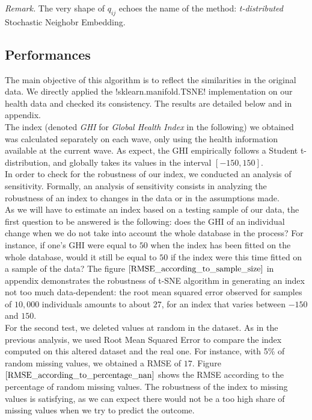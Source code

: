 \documentclass[]{article}
\begin{document}
\noindent
\textit{Remark.} The very shape of $q_{ij}$ echoes the name of the method: \textit{t-distributed} Stochastic Neighobr Embedding.

\subsection{Performances}
The main objective of this algorithm is to reflect the similarities in the original data. We directly applied the \pyth!sklearn.manifold.TSNE! implementation on our health data and checked its consistency. The results are detailed below and in appendix.\\

\noindent
The index (denoted \textit{GHI} for \textit{Global Health Index} in the following) we obtained was calculated separately on each wave, only using the health information available at the current wave. As expect, the GHI empirically follows a Student t-distribution, and globally takes its values in the interval $[-150, 150]$.\\

\noindent
In order to check for the robustness of our index, we conducted an analysis of sensitivity. Formally, an analysis of sensitivity consists in analyzing the robustness of an index to changes in the data or in the assumptions made.\\
As we will have to estimate an index based on a testing sample of our data, the first question to be answered is the following: does the GHI of an individual change when we do not take into account the whole database in the process? For instance, if one's GHI were equal to $50$ when the index has been fitted on the whole database, would it still be equal to $50$ if the index were this time fitted on a sample of the data? The figure $\ref{RMSE_according_to_sample_size}$ in appendix demonstrates the robustness of t-SNE algorithm in generating an index not too much data-dependent: the root mean squared error observed for samples of $10,000$ individuals amounts to about $27$, for an index that varies between $-150$ and $150$.\\
For the second test, we deleted values at random in the dataset. As in the previous analysis, we used Root Mean Squared Error to compare the index computed on this altered dataset and the real one. For instance, with 5\% of random missing values, we obtained a RMSE of $17$. Figure $\ref{RMSE_according_to_percentage_nan}$ shows the RMSE according to the percentage of random missing values. The robustness of the index to missing values is satisfying, as we can expect there would not be a too high share of missing values when we try to predict the outcome.\\
\end{document}
